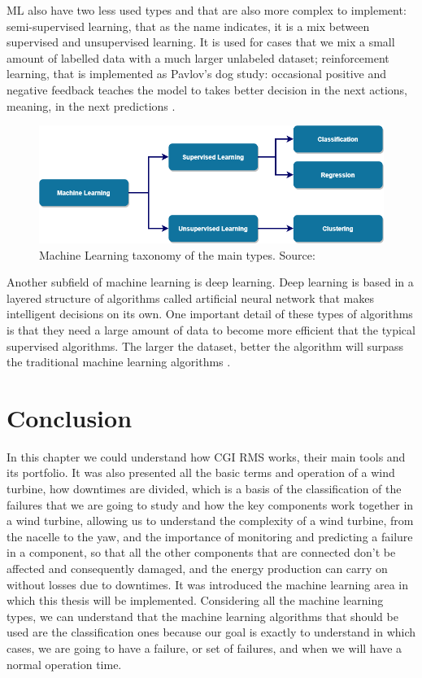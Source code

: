 ML also have two less used types and that are also more complex to implement: semi-supervised learning, that as the name indicates, it is a mix between supervised and unsupervised learning. It is used for cases that we mix a small amount of labelled data with a much larger unlabeled dataset; reinforcement learning, that is implemented as Pavlov’s dog study: occasional positive and negative feedback teaches the model to takes better decision in the next actions, meaning, in the next predictions \cite{46_ML}.

\begin{figure}[htbp]
	\centering
	\includegraphics[width=\textwidth]{Chapters/Figures/background_fig9.PNG}
	\caption{Machine Learning taxonomy of the main types. Source: \cite{FCT_AA} }
	\label{fig:Figuras_Tree_silhouettes-vectorial}
\end{figure}

Another subfield of machine learning is deep learning. Deep learning is based in a layered structure of algorithms called artificial neural network that makes intelligent decisions on its own. One important detail of these types of algorithms is that they need a large amount of data to become more efficient that the typical supervised algorithms. The larger the dataset, better the algorithm will surpass the traditional machine learning algorithms \cite{ML_Deep_Learning_2} \cite{ML_Deep_Learning}.


\section{Conclusion} 
\label{sub:if_you_use_this_template} 

In this chapter we could understand how CGI RMS works, their main tools and its portfolio. It was also presented all the basic terms and operation of a wind turbine, how downtimes are divided, which is a basis of the classification of the failures that we are going to study and how the key components work together in a wind turbine, allowing us to understand the complexity of a wind turbine, from the nacelle to the yaw, and the importance of monitoring and predicting a failure in a component, so that all the other components that are connected don't be affected and consequently damaged, and the energy production can carry on without losses due to downtimes. It was introduced the machine learning area in which this thesis will be implemented. Considering all the machine learning types, we can understand that the machine learning algorithms that should be used are the classification ones because our goal is exactly to understand in which cases, we are going to have a failure, or set of failures, and when we will have a normal operation time.
